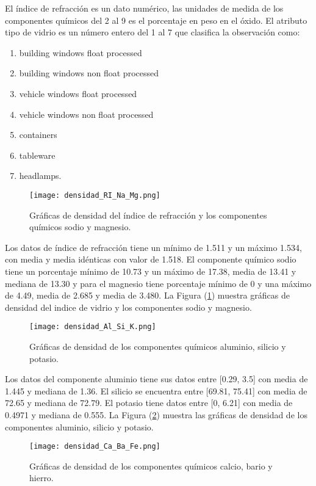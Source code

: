 El índice de refracción es un dato numérico, las unidades de medida de los componentes químicos del 2 al 9 es el porcentaje en peso en el óxido. El atributo tipo de vidrio es un número entero del 1 al 7 que clasifica la observación como:
\begin{enumerate}
	\item building windows float processed
	\item building windows non float processed
	\item vehicle windows float processed
	\item vehicle windows non float processed
	\item containers
	\item tableware
	\item headlamps.
\end{enumerate}

\begin{figure}
	\centering
	\texttt{[image: densidad\_RI\_Na\_Mg.png]}
	\caption{Gráficas de densidad del índice de refracción y los componentes químicos sodio y magnesio.} \label{fig:RINaMg}
\end{figure}

Los datos de índice de refracción tiene un mínimo de 1.511 y un máximo 1.534, con media y media idénticas con valor de 1.518. El componente químico sodio tiene un porcentaje mínimo de 10.73 y un máximo de 17.38, media de 13.41 y mediana de 13.30 y para el magnesio tiene porcentaje mínimo de 0 y una máximo de 4.49, media de 2.685 y media de 3.480. La Figura (\ref{fig:RINaMg}) muestra gráficas de densidad del indice de vidrio y los componentes sodio y magnesio.

\begin{figure}
	\centering
	\texttt{[image: densidad\_Al\_Si\_K.png]}
	\caption{Gráficas de densidad de los componentes químicos aluminio, silicio y potasio.} \label{fig:AlSiK}
\end{figure}

Los datos del componente aluminio tiene sus datos entre [0.29, 3.5] con media de 1.445 y mediana de 1.36. El silicio se encuentra entre [69.81, 75.41] con media de 72.65 y mediana de 72.79. El potasio tiene datos entre [0, 6.21] con media de 0.4971 y mediana de 0.555. La Figura (\ref{fig:AlSiK}) muestra las gráficas de densidad de los componentes aluminio, silicio y potasio.

\begin{figure}
	\centering
	\texttt{[image: densidad\_Ca\_Ba\_Fe.png]}
	\caption{Gráficas de densidad de los componentes químicos calcio, bario y hierro.} \label{fig:CaBaFe}
\end{figure}

